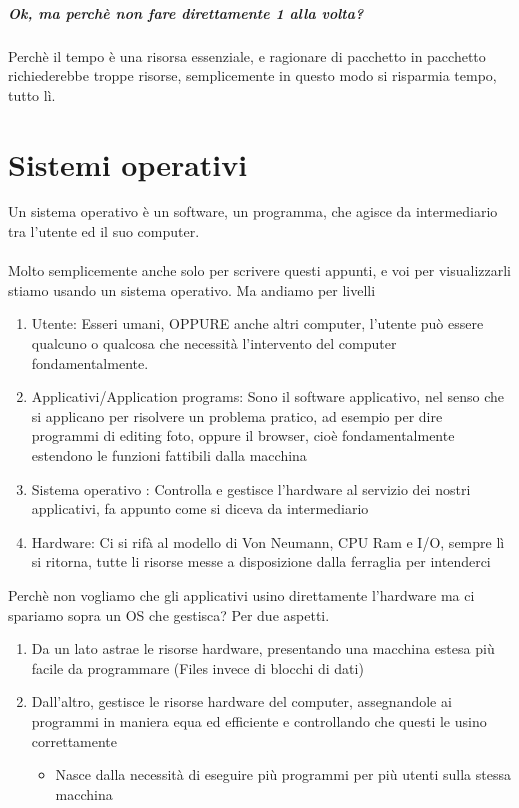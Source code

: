 \documentclass[12pt, a4paper, openany, twoside]{book}
\begin{document}
\paragraph{Ok, ma perchè non fare direttamente 1 alla volta?} Perchè il tempo
è una risorsa essenziale, e ragionare di pacchetto in pacchetto richiederebbe
troppe risorse, semplicemente in questo modo si risparmia tempo, tutto lì.
\chapter{Sistemi operativi}
Un sistema operativo è un software, un programma, che agisce da intermediario
tra l'utente ed il suo computer.\\ \\
Molto semplicemente anche solo per scrivere questi appunti, e voi per visualizzarli
stiamo usando un sistema operativo. Ma andiamo per livelli
\begin{enumerate}
	\item Utente: Esseri umani, OPPURE anche altri computer, l'utente può essere
	qualcuno o qualcosa che necessità l'intervento del computer fondamentalmente.
	\item Applicativi/Application programs: Sono il software applicativo, nel 
	senso che si applicano per risolvere un problema pratico, ad esempio per dire
	programmi di editing foto, oppure il browser, cioè fondamentalmente estendono
	le funzioni fattibili dalla macchina
	\item \color{red} Sistema operativo  \color{black}: Controlla e gestisce
	l'hardware al servizio dei nostri applicativi, fa appunto come si diceva da 
	intermediario
	\item Hardware: Ci si rifà al modello di Von Neumann, CPU Ram e I/O, sempre
	lì si ritorna, tutte li risorse messe a disposizione dalla ferraglia per 
	intenderci 
\end{enumerate} 
Perchè non vogliamo che gli applicativi usino direttamente l'hardware ma ci 
spariamo sopra un OS che gestisca? Per due aspetti.
\begin{enumerate}
	\item Da un lato astrae le risorse hardware, presentando una macchina estesa
	più facile da programmare (Files invece di blocchi di dati)
	\item Dall'altro, gestisce le risorse hardware del computer, assegnandole ai 
	programmi in maniera equa ed efficiente e controllando che questi le usino
	correttamente
	\begin{itemize}
		\item Nasce dalla necessità di eseguire più programmi per più utenti
		sulla stessa macchina
	\end{itemize}
\end{enumerate}
\end{document}
